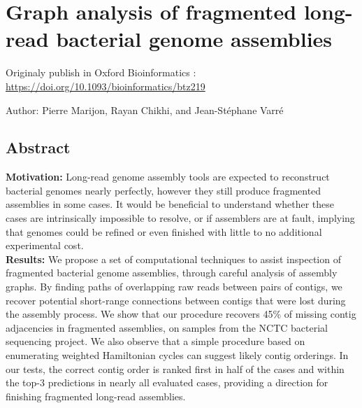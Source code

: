 \documentclass[./main.tex]{subfiles}
\newcommand{\modafterreview}[1]{#1}
\begin{document}

\section{Graph analysis of fragmented long-read bacterial genome assemblies} \label{section:postassembly:knot}

Originaly publish in Oxford Bioinformatics : \url{https://doi.org/10.1093/bioinformatics/btz219}

Author: Pierre Marijon, Rayan Chikhi, and Jean-St\'ephane Varr\'e\

\subsection{Abstract}
\textbf{Motivation:} Long-read genome assembly tools are expected to reconstruct bacterial genomes nearly perfectly, however they still produce fragmented assemblies in some cases. %
It would be beneficial to understand whether these cases are intrinsically impossible to resolve, or if assemblers are at fault, implying that genomes could be refined or even finished with little to no additional experimental cost. \\
%
\textbf{Results:}  We propose a set of \modafterreview{computational} techniques to assist inspection of fragmented bacterial genome assemblies, through careful analysis of assembly graphs. %
By finding paths of overlapping raw reads between pairs of contigs, we recover potential short-range connections between contigs that were lost during the assembly process.  We show that our procedure recovers \modafterreview{45\% of missing contig adjacencies} in fragmented \canu assemblies, on samples from the NCTC bacterial sequencing project.
We also observe that a simple procedure based on enumerating weighted Hamiltonian cycles can suggest likely contig orderings. In our tests, the correct contig order is ranked first in half of the cases and within the top-3 predictions in \modafterreview{nearly all evaluated} cases, providing a direction for finishing fragmented long-read assemblies.\\
\end{document}
